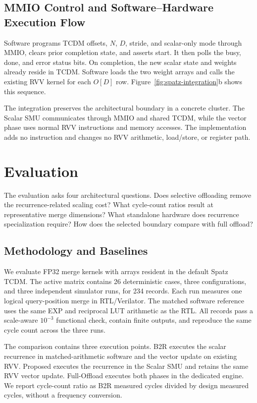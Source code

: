 \documentclass[journal]{IEEEtran}
\newcommand{\btor}{\mbox{B2R}}
\begin{document}
\subsection{MMIO Control and Software--Hardware Execution Flow}

Software programs TCDM offsets, $N$, $D$, stride, and scalar-only mode through
MMIO, clears prior completion state, and asserts start. It then polls the
busy, done, and error status bits. On completion, the new scalar state and
weights already reside in TCDM. Software loads the two weight arrays and calls
the existing RVV kernel for each $O[D]$ row. Figure~\ref{fig:spatz-integration}b
shows this sequence.

The integration preserves the architectural boundary in a concrete cluster.
The Scalar SMU communicates through MMIO and shared TCDM, while the vector
phase uses normal RVV instructions and memory accesses. The implementation
adds no instruction and changes no RVV arithmetic, load/store, or register
path.

\section{Evaluation}

The evaluation asks four architectural questions. Does selective offloading
remove the recurrence-related scaling cost? What cycle-count ratios result at
representative merge dimensions? What standalone hardware does recurrence
specialization require? How does the selected boundary compare with full
offload?

\subsection{Methodology and Baselines}

We evaluate FP32 merge kernels with arrays resident in the default Spatz
TCDM. The active matrix contains 26 deterministic cases, three configurations,
and three independent simulator runs, for 234 records. Each run measures one
logical query-position merge in RTL/Verilator. The matched software reference
uses the same EXP and reciprocal LUT arithmetic as the RTL. All records pass a
scale-aware $10^{-3}$ functional check, contain finite outputs, and reproduce
the same cycle count across the three runs.

The comparison contains three execution points. \btor{} executes the scalar
recurrence in matched-arithmetic software and the vector update on existing
RVV. Proposed executes the recurrence in the Scalar SMU and retains the same
RVV vector update. Full-Offload executes both phases in the dedicated engine.
We report cycle-count ratio as \btor{} measured cycles divided by design
measured cycles, without a frequency conversion.
\end{document}
